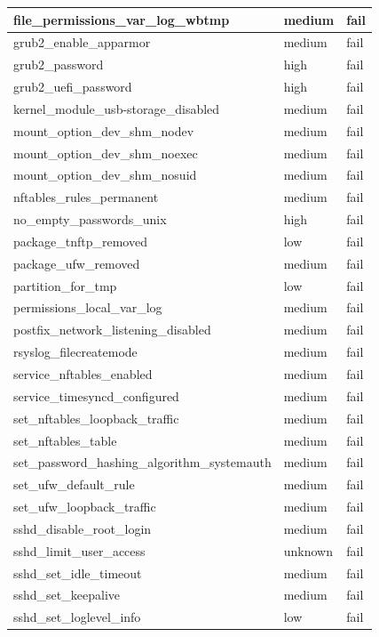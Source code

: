 \begin{longtable}{|p{10cm}|p{2cm}|p{2cm}|}
\hline
file\_permissions\_var\_log\_wbtmp & medium & fail \\
\hline
grub2\_enable\_apparmor & medium & fail \\
\hline
grub2\_password & high & fail \\
\hline
grub2\_uefi\_password & high & fail \\
\hline
kernel\_module\_usb-storage\_disabled & medium & fail \\
\hline
mount\_option\_dev\_shm\_nodev & medium & fail \\
\hline
mount\_option\_dev\_shm\_noexec & medium & fail \\
\hline
mount\_option\_dev\_shm\_nosuid & medium & fail \\
\hline
nftables\_rules\_permanent & medium & fail \\
\hline
no\_empty\_passwords\_unix & high & fail \\
\hline
package\_tnftp\_removed & low & fail \\
\hline
package\_ufw\_removed & medium & fail \\
\hline
partition\_for\_tmp & low & fail \\
\hline
permissions\_local\_var\_log & medium & fail \\
\hline
postfix\_network\_listening\_disabled & medium & fail \\
\hline
rsyslog\_filecreatemode & medium & fail \\
\hline
service\_nftables\_enabled & medium & fail \\
\hline
service\_timesyncd\_configured & medium & fail \\
\hline
set\_nftables\_loopback\_traffic & medium & fail \\
\hline
set\_nftables\_table & medium & fail \\
\hline
set\_password\_hashing\_algorithm\_systemauth & medium & fail \\
\hline
set\_ufw\_default\_rule & medium & fail \\
\hline
set\_ufw\_loopback\_traffic & medium & fail \\
\hline
sshd\_disable\_root\_login & medium & fail \\
\hline
sshd\_limit\_user\_access & unknown & fail \\
\hline
sshd\_set\_idle\_timeout & medium & fail \\
\hline
sshd\_set\_keepalive & medium & fail \\
\hline
sshd\_set\_loglevel\_info & low & fail \\

\end{longtable}
